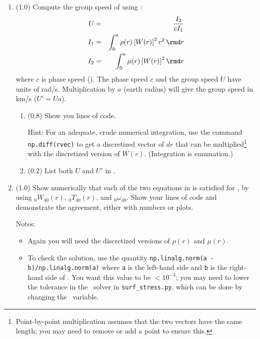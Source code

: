 \documentclass[11pt,titlepage,fleqn]{article}
\newcommand{\tfiless}{{\tt surf\_stress.py}}
\begin{document}
\begin{enumerate}

\item (1.0) Compute the group speed of  using \citep[][Eq. 11.67]{DT}:
%
\begin{eqnarray}
U &=& \frac{I_2}{cI_1}
\label{group}
\\
I_1 &=& \int_0^a \rho(r) \left[W(r)\right]^2 r^2 \, \rmd r
\\
I_2 &=& \int_0^a \mu(r) \left[W(r)\right]^2 \rmd r
\end{eqnarray}
%
where $c$ is phase speed (). %
The phase speed $c$ and the group speed $U$ have units of rad/s. Multiplication by $a$ (earth radius) will give the group speed in km/s ($U' = Ua$).
%
\begin{enumerate}
\item (0.8) Show you lines of code.

Hint: For an adequate, crude numerical integration, use the command \verb+np.diff(rvec)+ to get a discretized vector of $dr$ that can be multiplied\footnote{Point-by-point multiplication assumes that the two vectors have the same length; you may need to remove or add a point to ensure this.} with the discretized version of $W(r)$. (Integration is summation.)

\item (0.2) List both $U$ and $U'$ in .
\end{enumerate}

\label{prob:0T40_cubic_group}

\item (1.0) Show numerically that each of the two equations in  is satisfied for , by using $_0W_{40}(r)$, $_0T_{40}(r)$, and $_0\omega_{40}$. Show your lines of code and demonstrate the agreement, either with numbers or plots.

Notes:
%
\begin{itemize}
\item Again you will need the discretized versions of $\rho(r)$ and $\mu(r)$.

\item To check the solution, use the quantity \verb+np.linalg.norm(a - b)/np.linalg.norm(a)+ where \verb+a+ is the left-hand side and \verb+b+ is the right-hand side of . You want this value to be $< 10^{-3}$; you may need to lower the tolerance in the \sfind\ solver in \tfiless, which can be done by changing the \maxstep\ variable.


\end{itemize}
\end{enumerate}
\end{document}
